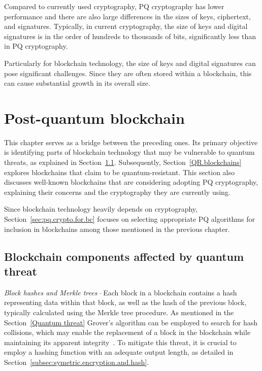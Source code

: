 Compared to currently used cryptography, PQ cryptography has lower performance and there are also large differences in the sizes of keys, ciphertext, and signatures. Typically, in current cryptography, the size of keys and digital signatures is in the order of hundreds to thousands of bits, significantly less than in PQ cryptography.

Particularly for blockchain technology, the size of keys and digital signatures can pose significant challenges. Since they are often stored within a blockchain, this can cause substantial growth in its overall size.


\chapter{Post-quantum blockchain}
\label{Post-quantum blockchain}

This chapter serves as a bridge between the preceding ones. Its primary objective is identifying parts of blockchain technology that may be vulnerable to quantum threats, as explained in Section~\ref{sec:QT.vulnerable.blockchain.components}. Subsequently, Section~\ref{QR.blockchains} explores blockchains that claim to be quantum-resistant. This section also discusses well-known blockchains that are considering adopting PQ cryptography, explaining their concerns and the cryptography they are currently using.

Since blockchain technology heavily depends on cryptography, Section~\ref{sec:pq.crypto.for.bc} focuses on selecting appropriate PQ algorithms for inclusion in blockchains among those mentioned in the previous chapter.


\section{Blockchain components affected by quantum threat}
\label{sec:QT.vulnerable.blockchain.components}

\emph{Block hashes and Merkle trees\,--\,}Each block in a blockchain contains a hash representing data within that block, as well as the hash of the previous block, typically calculated using the Merkle tree procedure. As mentioned in the Section~\ref{Quantum threat} Grover's algorithm can be employed to search for hash collisions, which may enable the replacement of a block in the blockchain while maintaining its apparent integrity~\cite{pqc.towards.bc.8967098}. To mitigate this threat, it is crucial to employ a hashing function with an adequate output length, as detailed in Section~\ref{subsec:symetric.encryption.and.hash}.

